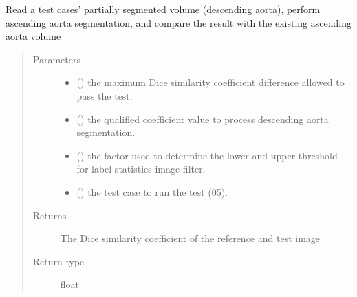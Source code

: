 \documentclass[letterpaper,10pt,english]{sphinxmanual}
\begin{document}
\begin{fulllineitems}
\label{\detokenize{test:test_image_preprocessing.test_compare_asc}}
\sphinxAtStartPar
Read a test cases’ partially segmented volume (descending aorta),
perform ascending aorta segmentation,
and compare the result with the existing ascending aorta volume
\begin{quote}\begin{description}
\item[{Parameters}] \leavevmode\begin{itemize}
\item {} 
\sphinxAtStartPar
{} () \textendash{} the maximum Dice similarity coefficient difference allowed to pass the test.

\item {} 
\sphinxAtStartPar
{} () \textendash{} the qualified coefficient value to process descending aorta segmentation.

\item {} 
\sphinxAtStartPar
{} () \textendash{} the factor used to determine the lower and upper threshold for label statistics image filter.

\item {} 
\sphinxAtStartPar
{} () \textendash{} the test case to run the test (0\sphinxhyphen{}5).

\end{itemize}

\item[{Returns}] \leavevmode
\sphinxAtStartPar
The Dice similarity coefficient of the reference and test image

\item[{Return type}] \leavevmode
\sphinxAtStartPar
float

\end{description}\end{quote}

\end{fulllineitems}
\end{document}
